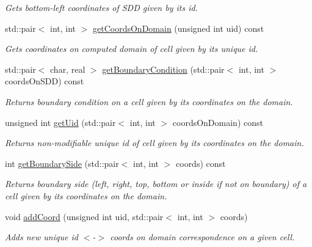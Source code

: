 \begin{DoxyCompactItemize}
\begin{DoxyCompactList}\small\item\em Gets bottom-\/left coordinates of S\+DD given by its id. \end{DoxyCompactList}\item 
std\+::pair$<$ int, int $>$ \mbox{\hyperlink{classDomain_a1d2f7ee9336c682d4d6b01893d0beb4f}{get\+Coords\+On\+Domain}} (unsigned int uid) const
\begin{DoxyCompactList}\small\item\em Gets coordinates on computed domain of cell given by its unique id. \end{DoxyCompactList}\item 
std\+::pair$<$ char, real $>$ \mbox{\hyperlink{classDomain_a1f219d1f46645da98f538dada37432f9}{get\+Boundary\+Condition}} (std\+::pair$<$ int, int $>$ coords\+On\+S\+DD) const
\begin{DoxyCompactList}\small\item\em Returns boundary condition on a cell given by its coordinates on the domain. \end{DoxyCompactList}\item 
\mbox{\label{classDomain_a657f0b6750e14d1d3cde6afd8b1e9b48}} 
unsigned int \mbox{\hyperlink{classDomain_a657f0b6750e14d1d3cde6afd8b1e9b48}{get\+Uid}} (std\+::pair$<$ int, int $>$ coords\+On\+Domain) const
\begin{DoxyCompactList}\small\item\em Returns non-\/modifiable unique id of cell given by its coordinates on the domain. \end{DoxyCompactList}\item 
\mbox{\label{classDomain_a677ba729e74d00b167b51ab6c921782a}} 
int \mbox{\hyperlink{classDomain_a677ba729e74d00b167b51ab6c921782a}{get\+Boundary\+Side}} (std\+::pair$<$ int, int $>$ coords) const
\begin{DoxyCompactList}\small\item\em Returns boundary side (left, right, top, bottom or inside if not on boundary) of a cell given by its coordinates on the domain. \end{DoxyCompactList}\item 
void \mbox{\hyperlink{classDomain_a1463e043dbcda6e6755dda83c26d6b73}{add\+Coord}} (unsigned int uid, std\+::pair$<$ int, int $>$ coords)
\begin{DoxyCompactList}\small\item\em Adds new unique id $<$-\/$>$ coords on domain correspondence on a given cell. \end{DoxyCompactList}\item 

\end{DoxyCompactItemize}
